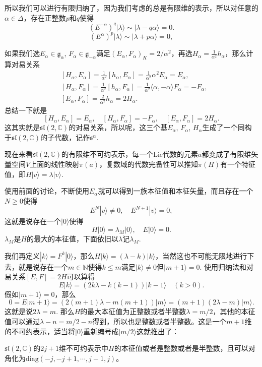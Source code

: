 \documentclass[9pt]{extarticle}
\newcommand{\cc}{\mathbb{C}}
\newcommand{\lag}{{\mathfrak{g}}}
\begin{document}
所以我们可以进行有限归纳了，因为我们考虑的总是有限维的表示，所以对任意的$\alpha\in \Delta$，存在正整数$p$和$q$使得
\[
	(E^{-\alpha})^q |\lambda\rangle\sim |\lambda-q\alpha\rangle =0.
\]
\[
	(E^{\alpha})^p |\lambda\rangle\sim |\lambda+p\alpha\rangle =0,
\]

\para 如果我们选$E_\alpha\in\lag_\alpha$, $F_\alpha\in\lag_{-\alpha}$满足$(E_\alpha,F_{\alpha})_K=2/\alpha^2$，再选$H_\alpha=\frac{1}{\alpha^2}h_\alpha$，那么计算对易关系
\[
	\begin{split}
	&[H_\alpha,E_\alpha]=\frac{1}{\alpha^2}[h_\alpha,E_\alpha]=\frac{1}{\alpha^2}\alpha^2 E_\alpha=E_\alpha,\\
	&[H_\alpha,F_\alpha]=\frac{1}{\alpha^2}[h_\alpha,F_\alpha]=\frac{1}{\alpha^2}\langle \alpha,-\alpha \rangle F_\alpha=-F_\alpha,\\
	&[E_\alpha,F_\alpha]=\frac{2}{\alpha^2}h_\alpha=2H_\alpha.
	\end{split}
\]
总结一下就是
\[
	[H_\alpha,E_\alpha]=E_\alpha,\quad[H_\alpha,F_\alpha]=-F_\alpha,\quad[E_\alpha,F_\alpha]=2H_\alpha.
\]
这其实就是$\mathfrak{sl}(2,\cc)$的对易关系，所以呢，这三个基$E_\alpha$, $F_\alpha$, $H_\alpha$生成了一个同构于$\mathfrak{sl}(2,\cc)$的子代数，记作$\mathfrak{s}^\alpha$.

\para 现在来看$\mathfrak{sl}(2,\cc)$的有限维不可约表示，每一个Lie代数的元素$a$都变成了有限维矢量空间$V$上面的线性映射$\pi(a)$，复数域的代数完备性可以推知$\pi(H)$有一个特征值，即$H|v\rangle=\lambda |v\rangle$.

使用前面的讨论，不断使用$E_\alpha$就可以得到一族本征值和本征矢量，而且存在一个$N\geq 0$使得
\[
	E^N|v\rangle\neq 0,\quad E^{N+1}|v\rangle =0,
\]
这就是说存在一个$|0\rangle$使得
\[
	H|0\rangle =\lambda_M |0\rangle,\quad E|0\rangle =0.
\]
$\lambda_M$是$H$的最大的本征值，下面依旧以$\lambda$记$\lambda_M$.

我们再定义$|k\rangle=F^k|0\rangle$，那么$H|k\rangle=(\lambda-k) |k\rangle$，当然这也不可能无限地进行下去，就是说存在一个$m\in \mathbb{N}$使得$k\leq m$满足$|k\rangle\neq 0$但$|m+1\rangle=0$. 使用归纳法和对易关系$[E,F]=2H$可以算得
\[
E|k\rangle=(2k\lambda -k(k-1)) |k-1\rangle\quad (k>0).
\]
假如$|m+1\rangle =0$，那么
\[
0=E|m+1\rangle=(2(m+1)\lambda -m(m+1)) |m\rangle =(m+1)(2\lambda-m)|m\rangle.
\]
这就是说$2\lambda=m$. 那么$H$的最大本征值为正整数或者半整数$\lambda=m/2$，其他的本征值可以通过$\lambda-n=m/2-n$得到，所以也是整数或者半整数。这是一个$m+1$维的不可约表示，适当将$|0\rangle$重新编号成$|m/2\rangle$这就推出了：

\pro $\mathfrak{sl}(2,\cc)$的$2j+1$维不可约表示中$H$的本征值或者是整数或者是半整数，且可以对角化为$\mathrm{diag}(-j,-j+1,\cdots,j-1,j)$。
\end{document}
